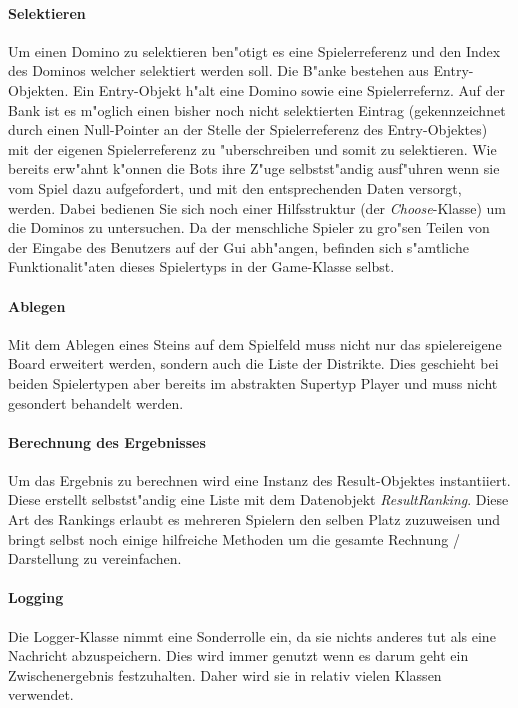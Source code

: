 \paragraph{Selektieren}
Um einen Domino zu selektieren ben"otigt es eine Spielerreferenz und den Index des Dominos welcher selektiert werden soll. Die B"anke bestehen aus Entry-Objekten. Ein Entry-Objekt h"alt eine Domino sowie eine Spielerrefernz. 
Auf der Bank ist es m"oglich einen bisher noch nicht selektierten Eintrag (gekennzeichnet durch einen Null-Pointer an der Stelle der Spielerreferenz des Entry-Objektes) mit der eigenen Spielerreferenz zu "uberschreiben und somit zu selektieren. Wie bereits erw"ahnt k"onnen die Bots ihre Z"uge selbstst"andig ausf"uhren wenn sie vom Spiel dazu aufgefordert, und mit den entsprechenden Daten versorgt, werden. Dabei bedienen Sie sich noch einer Hilfsstruktur (der \emph{Choose}-Klasse) um die Dominos zu untersuchen. Da der menschliche Spieler zu gro"sen Teilen von der Eingabe des Benutzers auf der Gui abh"angen, befinden sich s"amtliche Funktionalit"aten dieses Spielertyps in der Game-Klasse selbst. 

\paragraph{Ablegen}
Mit dem Ablegen eines Steins auf dem Spielfeld muss nicht nur das spielereigene Board erweitert werden, sondern auch die Liste der Distrikte. Dies geschieht bei beiden Spielertypen aber bereits im abstrakten Supertyp Player und muss nicht gesondert behandelt werden. 

\paragraph{Berechnung des Ergebnisses}
Um das Ergebnis zu berechnen wird eine Instanz des Result-Objektes instantiiert. Diese erstellt selbstst"andig eine Liste mit dem Datenobjekt \emph{ResultRanking}. Diese Art des Rankings erlaubt es mehreren Spielern den selben Platz zuzuweisen und bringt selbst noch einige hilfreiche Methoden um die gesamte Rechnung / Darstellung zu vereinfachen. 

\paragraph{Logging}
Die Logger-Klasse nimmt eine Sonderrolle ein, da sie nichts anderes tut als eine Nachricht abzuspeichern. Dies wird immer genutzt wenn es darum geht ein Zwischenergebnis festzuhalten. Daher wird sie in relativ vielen Klassen verwendet. 
